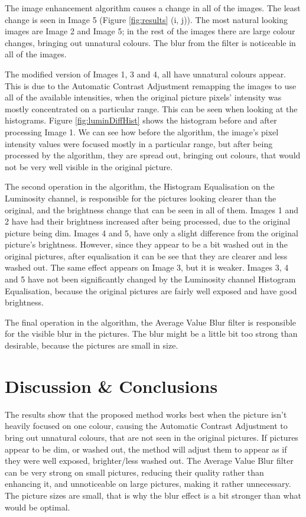\documentclass[journal,transmag]{IEEEtran}
\begin{document}
The image enhancement algorithm causes a change in all of the images. 
The least change is seen in Image 5 (Figure \ref{fig:results} (i, j)). The most natural looking images are Image 2 and Image 5; in the rest of the images there are large colour changes, bringing out unnatural colours. The blur from the filter is noticeable in all of the images.

The modified version of Images 1, 3 and 4, all have unnatural colours appear. This is due to the Automatic Contrast Adjustment remapping the images to use all of the available intensities, when the original picture pixels' intensity was mostly concentrated on a particular range. This can be seen when looking at the histograms. Figure \ref{fig:luminDiffHist} shows the histogram before and after processing Image 1. We can see how before the algorithm, the image's pixel intensity values were focused mostly in a particular range, but after being processed by the algorithm, they are spread out, bringing out colours, that would not be very well visible in the original picture.

The second operation in the algorithm, the Histogram Equalisation on the Luminosity channel, is responsible for the pictures looking clearer than the original, and the brightness change that can be seen in all of them. Images 1 and 2 have had their brightness increased after being processed, due to the original picture being dim. Images 4 and 5, have only a slight difference from the original picture's brightness. However, since they appear to be a bit washed out in the original pictures, after equalisation it can be see that they are clearer and less washed out. The same effect appears on Image 3, but it is weaker. Images 3, 4 and 5 have not been significantly changed by the Luminosity channel Histogram Equalisation, because the original pictures are fairly well exposed and have good brightness.

The final operation in the algorithm, the Average Value Blur filter is responsible for the visible blur in the pictures. The blur might be a little bit too strong than desirable, because the pictures are small in size.

\section{Discussion \& Conclusions}
\label{sec:discussion}

The results show that the proposed method works best when the picture isn't heavily focused on one colour, causing the Automatic Contrast Adjustment to bring out unnatural colours, that are not seen in the original pictures. If pictures appear to be dim, or washed out, the method will adjust them to appear as if they were well exposed, brighter/less washed out. 
The Average Value Blur filter can be very strong on small pictures, reducing their quality rather than enhancing it, and unnoticeable on large pictures, making it rather unnecessary. The picture sizes are small, that is why the blur effect is a bit stronger than what would be optimal.
\end{document}
